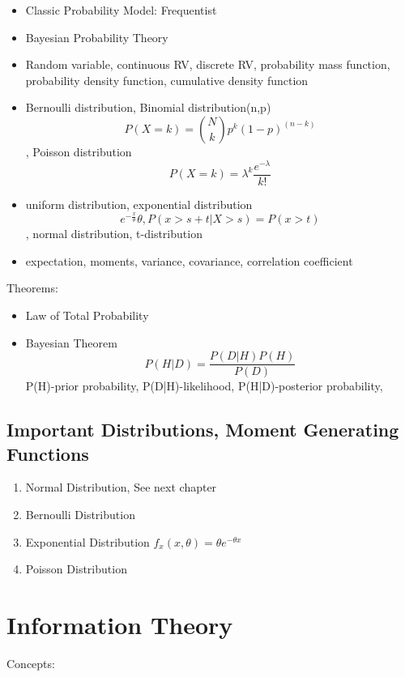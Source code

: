\documentclass[11pt, openany]{book}              %
\begin{document}
\begin{itemize}
    \item Classic Probability Model: Frequentist 
    \item Bayesian Probability Theory 
    \item Random variable, continuous RV, discrete RV, probability mass function, probability density function, cumulative density function
    \item Bernoulli distribution, Binomial distribution(n,p)$$P(X=k) = {N\choose k} p^k (1-p)^{(n-k)}$$, Poisson distribution $$P(X=k) = \lambda^k \frac{e^{-\lambda}}{k!}$$
    \item uniform distribution, exponential distribution $$e^{-\frac{x}{\theta}}\theta, P(x>s+t|X>s) = P(x>t)$$, normal distribution, t-distribution
    \item expectation, moments, variance, covariance, correlation coefficient
\end{itemize}


Theorems:

\begin{itemize}
    \item Law of Total Probability
    \item Bayesian Theorem $$P(H|D) = \frac{P(D|H) P(H)}{P(D)}$$ P(H)-prior probability, P(D|H)-likelihood, P(H|D)-posterior probability,
\end{itemize}

\subsection{Important Distributions, Moment Generating Functions}

\begin{enumerate}
	\item Normal Distribution, See next chapter
	\item Bernoulli Distribution 
	\item Exponential Distribution $f_x(x,\theta) = \theta e^{-\theta x} $
	\item Poisson Distribution
	
\end{enumerate} 
\section{Information Theory}

Concepts:
\end{document}
